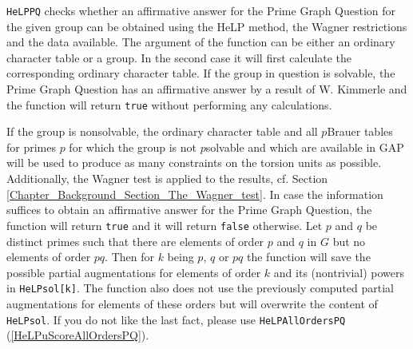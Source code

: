 \documentclass[a4paper,11pt]{report}
\begin{document}
{{{ \texttt{HeLP{\textunderscore}PQ} checks whether an affirmative answer for the Prime Graph Question for the
given group can be obtained using the HeLP method, the Wagner restrictions and
the data available. The argument of the function can be either an ordinary
character table or a group. In the second case it will first calculate the
corresponding ordinary character table. If the group in question is solvable,
the Prime Graph Question has an affirmative answer by a result of W. Kimmerle
and the function will return \texttt{true} without performing any calculations.

 If the group is non\texttt{}solvable, the ordinary character table
and all $p$\texttt{}Brauer tables for primes $p$ for which the group is not $p$\texttt{}solvable and which are available in GAP will be used to
produce as many constraints on the torsion units as possible. Additionally,
the Wagner test is applied to the results, cf. Section \ref{Chapter_Background_Section_The_Wagner_test}. In case the information suffices to obtain an affirmative answer for the
Prime Graph Question, the function will return \texttt{true} and it will return \texttt{false} otherwise. Let $p$ and $q$ be distinct primes such that there are elements of order $p$ and $q$ in $G$ but no elements of order $pq$. Then for $k$ being $p$, $q$ or $pq$ the function will save the possible partial augmentations for elements of
order $k$ and its (non\texttt{}trivial) powers in \texttt{HeLP{\textunderscore}sol[k]}. The function also does not use the previously computed partial augmentations
for elements of these orders but will overwrite the content of \texttt{HeLP{\textunderscore}sol}. If you do not like the last fact, please use \texttt{HeLP{\textunderscore}AllOrdersPQ} (\ref{HeLPuScoreAllOrdersPQ}). }

}}
\end{document}
